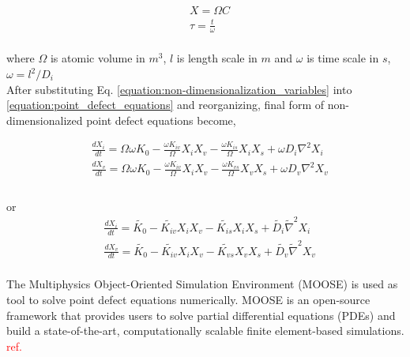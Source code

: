 \documentclass[utf8]{frontiersSCNS} %
\begin{document}
    \begin{equation}
      \begin{aligned}
        &X = \Omega C\\
        &\tau = \frac{t}{\omega}\\
      \end{aligned}
      \label{equation:non-dimensionalization_variables}
    \end{equation}

    where ${\Omega}$ is atomic volume in ${m^3}$, ${l}$ is length scale in ${m}$ and ${\omega}$ is time scale in ${s}$, ${\omega= l^2/D_i}$\\

    After substituting Eq. \ref{equation:non-dimensionalization_variables} into \ref{equation:point_defect_equations} and reorganizing, final form  of non-dimensionalized point defect equations become,

    \begin{equation}
      \begin{aligned}
        &\frac{dX_i}{dt} = \Omega\omega K_0 - \frac{\omega K_{iv}}{\Omega}X_iX_v - \frac{\omega K_{is}}{\Omega}X_iX_s + \omega D_i\nabla^2 X_i\\
        &\frac{dX_v}{dt} = \Omega\omega K_0 - \frac{\omega K_{iv}}{\Omega}X_iX_v - \frac{\omega K_{vs}}{\Omega}X_vX_s + \omega D_v\nabla^2 X_v\\
      \end{aligned}
      \label{equation:non-dimensionalized_point_defect_equations}
    \end{equation}\\
    or
    \begin{equation}
      \begin{aligned}
        &\frac{dX_i}{dt} = \widetilde{K_0} - \widetilde{K_{iv}}X_iX_v - \widetilde{K_{is}}X_iX_s + \widetilde{D_i}\widetilde{\nabla}^2 X_i\\
        &\frac{dX_v}{dt} = \widetilde{K_0} - \widetilde{K_{iv}}X_iX_v - \widetilde{K_{vs}}X_vX_s + \widetilde{D_v}\widetilde{\nabla}^2 X_v\\
      \end{aligned}
      \label{equation:non-dimensionalized_point_defect_equations}
    \end{equation}

    The Multiphysics Object-Oriented Simulation Environment (MOOSE) is used as tool to solve point defect equations numerically. MOOSE is an open-source framework that provides users to solve partial differential equations (PDEs) and build a state-of-the-art, computationally scalable finite element-based simulations. \textcolor{red}{ref.}\\
\end{document}
